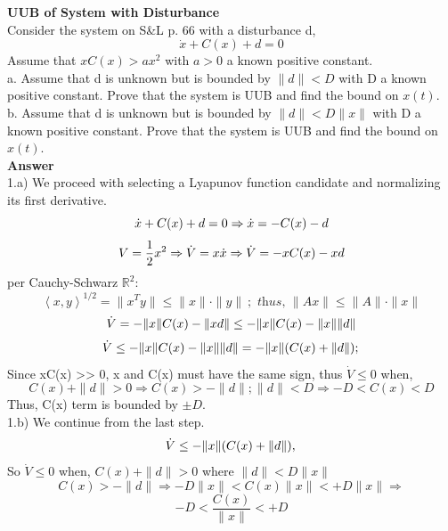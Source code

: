 \documentclass{homeworg}
\newcommand{\transpose}[1]{\ensuremath{#1^{\scriptscriptstyle T}}}
\begin{document}
\exercise %
\noindent
\textbf{UUB of System with Disturbance}\\
Consider the system on S\&L p. 66 with a disturbance d,
\begin{equation*}
  \dot{x} + C(x) + d = 0
\end{equation*}
Assume that \(xC(x) > a x^2 \) with \( a > 0\) a known positive constant.\\
a. Assume that d is unknown but is bounded by \(\|d\| < D \) with D a known
positive constant. Prove that the system is UUB and find the bound on \(x(t)\).\\
b. Assume that d is unknown but is bounded by \(\|d\| < D\|x\| \) with D a
known positive constant. Prove that the system is UUB and find the bound
on \(x(t)\).\\
\noindent
\textbf{Answer} \\
1.a) We proceed with selecting a Lyapunov function candidate and normalizing its
first derivative.\\
\begin{equation*}
  \dot{x} + C(x) + d = 0 \Rightarrow \dot{x} = - C(x) - d \\
\end{equation*}
\begin{equation*}
  V=\frac{1}{2}x^2\Rightarrow \dot{V} = x\dot{x} \Rightarrow \dot{V} =-xC(x)-xd \\
\end{equation*}
per Cauchy-Schwarz \(\mathbb{R}^2\):
\begin{equation*}
  \left<x,y\right>^{1/2} = \| \transpose{x}y\| \leq \|x\| \cdot \|y\|~; \textit{ thus, } \|Ax\| \leq \|A\| \cdot \|x\|
\end{equation*}
\begin{equation*}
  \dot{V} = -\|x\|C(x)-\|xd\| \leq  -\|x\|C(x)-\|x\| \|d\| \\
\end{equation*}
\begin{equation*}
  \dot{V} \leq  -\|x\|C(x)-\|x\| \|d\| = -\|x\|(C(x)+\|d\|) ;\\
\end{equation*}
Since xC(x) >> 0, x and C(x) must have the same sign, thus \(\dot{V} \leq 0 \) when,
\begin{equation*}
  C(x)+\|d\| > 0 \Rightarrow C(x) > -\|d\| ; \|d\| < D \Rightarrow - D < C(x)< D
\end{equation*}
Thus, C(x) term is bounded by \(\pm D\).\\

1.b) We continue from the last step.
\begin{equation*}
  \dot{V} \leq  -\|x\|(C(x)+\|d\|), \\
\end{equation*}
So \(\dot{V} \leq 0 \) when, \(C(x)+\|d\| >0\) where \(\|d\| < D\|x\| \)
\begin{equation*}
  C(x) > - \|d\| \Rightarrow -D\|x\| < C(x)\|x\| < +D\|x\| \Rightarrow
\end{equation*}
\begin{equation*}
  -D < \frac{C(x)}{\|x\|} < +D
\end{equation*}
\end{document}
